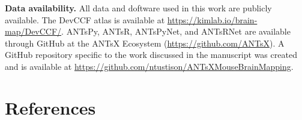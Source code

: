 \documentclass[
  12pt,
]{article}
\begin{document}
\clearpage
\newpage

\textbf{Data availability.} All data and doftware used in this work are
publicly available. The DevCCF atlas is available at
\url{https://kimlab.io/brain-map/DevCCF/}. ANTsPy, ANTsR, ANTsPyNet, and
ANTsRNet are available through GitHub at the ANTsX Ecosystem
(\url{https://github.com/ANTsX}). A GitHub repository specific to the
work discussed in the manuscript was created and is available at
\url{https://github.com/ntustison/ANTsXMouseBrainMapping}.

\clearpage

\hypertarget{references}{%
\section*{References}\label{references}}
\end{document}
